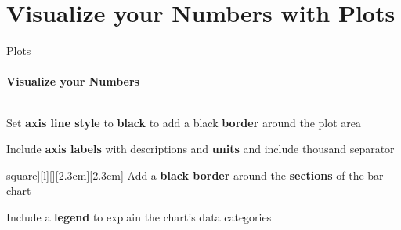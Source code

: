 \documentclass[aspectratio=169]{beamer}
\begin{document}
\section{Visualize your Numbers with \textbf{Plots}}

\begin{frame}
    \agenda     
\end{frame}

\begin{frame}{Plots}
    \framesubtitle{Visualize your Numbers}

    \vspace{-1cm}
    \begin{columns}
        \begin{column}{0.49\textwidth}
            \begin{coloredblockicon}
                \footnotesize
                Set \textbf{axis line style} to \textbf{black} to add a black \textbf{border} around the plot area
            \end{coloredblockicon}
            \vspace{-0.1cm}
            \begin{coloredblockicon}
                \footnotesize
                Include \textbf{axis labels} with descriptions and \textbf{units} and include thousand separator
            \end{coloredblockicon}
            \vspace{-0.1cm}
            \begin{coloredblockicon}[grey][][][\large\faIcon[regular]{square}][l][][2.3cm][2.3cm]
                \footnotesize
                Add a \textbf{black border} around the \textbf{sections} of the bar chart
            \end{coloredblockicon}
            \vspace{-0.1cm}
            \begin{coloredblockicon}
                \footnotesize
                Include a \textbf{legend} to explain the chart's data categories
            \end{coloredblockicon}
            \vspace{-0.1cm}

\end{column}
\end{columns}
\end{frame}
\end{document}
